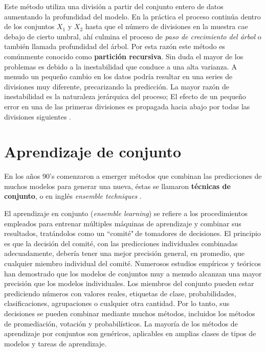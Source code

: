     Este método utiliza una división a partir del conjunto entero de datos aumentando la profundidad del modelo. En la práctica el proceso continúa
    dentro de los conjuntos $X_1$ y $X_2$ hasta que el número de divisiones en la muestra cae debajo de cierto umbral, ahí culmina el proceso de
    \textit{paso de crecimiento del árbol}\cite{18} o también llamada profundidad del árbol.
    Por esta razón este método es comúnmente conocido como \textbf{partición recursiva}. Sin duda el mayor de los problemas es debido a la inestabilidad que conduce a una alta varianza. 
    A menudo un pequeño cambio en los datos podría resultar en una series de divisiones muy diferente, precarizando la predicción. La mayor razón de inestabilidad es la naturaleza 
    jerárquica del proceso; El efecto de un pequeño error en una de las primeras divisiones es propagada hacia abajo por todas las divisiones siguientes \cite{13}.
%
%
%
%
\section{Aprendizaje de conjunto}
En los años 90's comenzaron a emerger métodos que combinan las predicciones de muchos modelos para generar una nueva, éstas se llamaron \textbf{técnicas de conjunto},
o en inglés \textit{ensemble techniques} \cite{18}.

El aprendizaje en conjunto (\textit{ensemble learning}) se refiere a los procedimientos empleados para entrenar múltiples máquinas de aprendizaje y combinar sus resultados, tratándolos como un ``comité"$~$de tomadores de decisiones. 
El principio es que la decisión del comité, con las predicciones individuales combinadas adecuadamente, debería tener una mejor precisión general, en promedio, que cualquier miembro individual del comité. 
Numerosos estudios empíricos y teóricos han demostrado que los modelos de conjuntos muy a menudo alcanzan una mayor precisión que los modelos individuales.
Los miembros del conjunto pueden estar prediciendo números con valores reales, etiquetas de clase, probabilidades, clasificaciones, agrupaciones o cualquier otra cantidad. Por lo tanto, 
sus decisiones se pueden combinar mediante muchos métodos, incluidos los métodos de promediación, votación y probabilísticos. La mayoría de los métodos de aprendizaje por conjuntos son genéricos, 
aplicables en amplias clases de tipos de modelos y tareas de aprendizaje\cite{6}.


